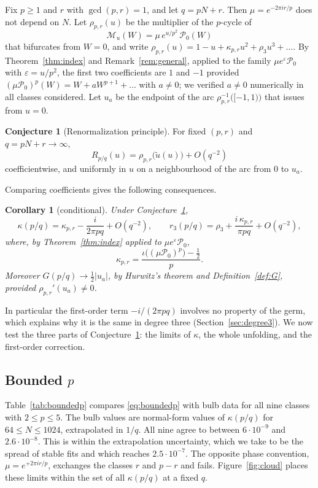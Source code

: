 \documentclass[11pt]{amsart}
\newtheorem{corollary}[theorem]{Corollary}
\theoremstyle{definition}
\newtheorem{conjecture}[theorem]{Conjecture}
\theoremstyle{remark}
\newcommand{\PP}{\mathcal{P}_0}
\newcommand{\Mf}{\mathcal{M}}
\begin{document}
Fix $p\ge1$ and $r$ with $\gcd(p,r)=1$, and let $q=pN+r$. Then $\mu=e^{-2\pi ir/p}$ does not depend on $N$. Let $\rho_{p,r}(u)$ be the multiplier of the $p$-cycle of
\[
\Mf_u(W)=\mu\,e^{u/p^2}\,\PP(W)
\]
that bifurcates from $W=0$, and write $\rho_{p,r}(u)=1-u+\kappa_{p,r}u^2+\rho_3u^3+\dots$. By Theorem~\ref{thm:index} and Remark~\ref{rem:general}, applied to the family $\mu e^{\varepsilon}\PP$ with $\varepsilon=u/p^2$, the first two coefficients are $1$ and $-1$ provided $(\mu\PP)^p(W)=W+aW^{p+1}+\dots$ with $a\ne0$; we verified $a\ne0$ numerically in all classes considered. Let $u_a$ be the endpoint of the arc $\rho_{p,r}^{-1}\bigl([-1,1)\bigr)$ that issues from $u=0$.

\begin{conjecture}[Renormalization principle]\label{conj:unfolding}
For fixed $(p,r)$ and $q=pN+r\to\infty$,
\[
R_{p/q}(u)=\rho_{p,r}\bigl(\tilde u(u)\bigr)+O(q^{-2})
\]
coefficientwise, and uniformly in $u$ on a neighbourhood of the arc from $0$ to $u_a$.
\end{conjecture}

Comparing coefficients gives the following consequences.

\begin{corollary}[conditional]\label{cor:kinematic}
Under Conjecture~\ref{conj:unfolding},
\begin{equation}\label{eq:kinematic}
\kappa(p/q)=\kappa_{p,r}-\frac{i}{2\pi pq}+O(q^{-2}),\qquad r_3(p/q)=\rho_3+\frac{i\,\kappa_{p,r}}{\pi pq}+O(q^{-2}),
\end{equation}
where, by Theorem~\ref{thm:index} applied to $\mu e^\varepsilon\PP$,
\begin{equation}\label{eq:boundedp}
\kappa_{p,r}=\frac{\iota\bigl((\mu\PP)^p\bigr)-\frac12}{p}.
\end{equation}
Moreover $G(p/q)\to\frac12|u_a|$, by Hurwitz's theorem and Definition~\ref{def:G}, provided $\rho_{p,r}'(u_a)\ne0$.
\end{corollary}

In particular the first-order term $-i/(2\pi pq)$ involves no property of the germ, which explains why it is the same in degree three (Section~\ref{sec:degree3}). We now test the three parts of Conjecture~\ref{conj:unfolding}: the limits of $\kappa$, the whole unfolding, and the first-order correction.

\subsection{Bounded $p$}\label{sec:boundedp}
Table~\ref{tab:boundedp} compares \eqref{eq:boundedp} with bulb data for all nine classes with $2\le p\le5$. The bulb values are normal-form values of $\kappa(p/q)$ for $64\le N\le1024$, extrapolated in $1/q$. All nine agree to between $6\cdot10^{-9}$ and $2.6\cdot10^{-8}$. This is within the extrapolation uncertainty, which we take to be the spread of stable fits and which reaches $2.5\cdot10^{-7}$. The opposite phase convention, $\mu=e^{+2\pi ir/p}$, exchanges the classes $r$ and $p-r$ and fails. Figure~\ref{fig:cloud} places these limits within the set of all $\kappa(p/q)$ at a fixed $q$.
\end{document}
